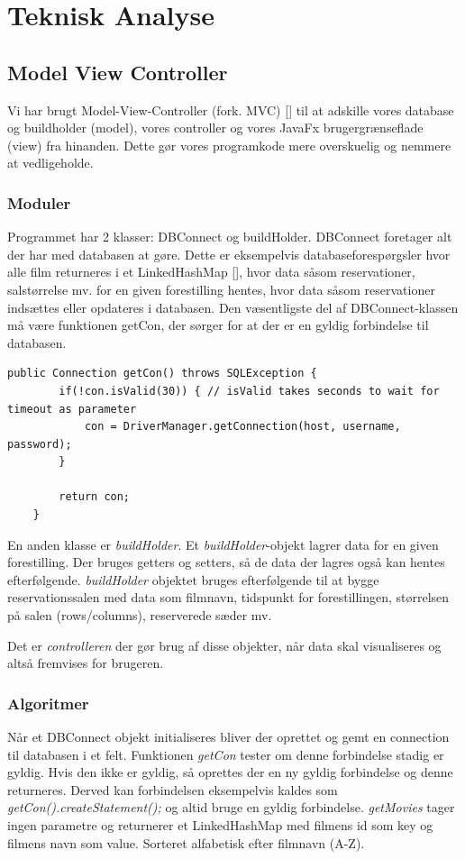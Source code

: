 \documentclass[final]{report}
\begin{document}
\chapter{Teknisk Analyse}
\section{Model View Controller}
Vi har brugt Model-View-Controller (fork. MVC) [\cite{MVC}] til at adskille vores database og buildholder (model), vores controller og vores JavaFx brugergrænseflade (view) fra hinanden. Dette gør vores programkode mere overskuelig og nemmere at vedligeholde.

\subsection{Moduler}
Programmet har 2 klasser: DBConnect og buildHolder.
DBConnect foretager alt der har med databasen at gøre. Dette er eksempelvis databaseforespørgsler hvor alle film returneres i et LinkedHashMap [\cite{oracle}], hvor data såsom reservationer, salstørrelse mv. for en given forestilling hentes, hvor data såsom reservationer indsættes eller opdateres i databasen. Den væsentligste del af DBConnect-klassen må være funktionen getCon, der sørger for at der er en gyldig forbindelse til databasen. 

\begin{verbatim}
public Connection getCon() throws SQLException {
        if(!con.isValid(30)) { // isValid takes seconds to wait for timeout as parameter
            con = DriverManager.getConnection(host, username, password);
        }

        return con;
    }
\end{verbatim}

En anden klasse er \emph{buildHolder}. Et \emph{buildHolder}-objekt lagrer data for en given forestilling. Der bruges getters og setters, så de data der lagres også kan hentes efterfølgende. \emph{buildHolder} objektet bruges efterfølgende til at bygge reservationssalen med data som filmnavn, tidspunkt for forestillingen, størrelsen på salen (rows/columns), reserverede sæder mv. 

Det er \emph{controlleren} der gør brug af disse objekter, når data skal visualiseres og altså fremvises for brugeren.

\subsection{Algoritmer}
Når et DBConnect objekt initialiseres bliver der oprettet og gemt en connection til databasen i et felt. Funktionen \emph{getCon} tester om denne forbindelse stadig er gyldig. Hvis den ikke er gyldig, så oprettes der en ny gyldig forbindelse og denne returneres. Derved kan forbindelsen eksempelvis kaldes som \emph{getCon().createStatement();} og altid bruge en gyldig forbindelse. \emph{getMovies} tager ingen parametre og returnerer et LinkedHashMap med filmens id som key og filmens navn som value. Sorteret alfabetisk efter filmnavn (A-Z).
\end{document}
